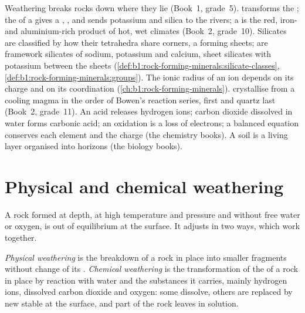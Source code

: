 \begin{recall}
Weathering breaks rocks down where they lie (Book~1, grade~5).  transforms the ; the  of a  gives a , , and sends potassium and silica to the rivers; a  is
the red, iron- and aluminium-rich product of hot, wet climates (Book~2,
grade~10). Silicates are classified by how their  tetrahedra share
corners, a  forming sheets;  are framework silicates of
sodium, potassium and calcium,  sheet silicates with potassium between the
sheets (\cref{def:b1:rock-forming-minerals:silicate-classes},
\cref{def:b1:rock-forming-minerals:groups}). The ionic radius of an ion depends on
its charge and on its coordination (\cref{ch:b1:rock-forming-minerals}). 
crystallise from a cooling magma in the order of Bowen's reaction series,
 first and quartz last (Book~2, grade~11). An acid releases hydrogen
ions; carbon dioxide dissolved in water forms carbonic acid; an oxidation is a
loss of electrons; a balanced equation conserves each element and the charge
(the chemistry books). A soil is a living layer organised into horizons (the
biology books).
\end{recall}

\section{Physical and chemical weathering}\label{sec:b1:weathering-clays:types}

A rock formed at depth, at high temperature and pressure and without free water
or oxygen, is out of equilibrium at the surface. It adjusts in two ways, which
work together.

\begin{definition}\label{def:b1:weathering-clays:weathering}
\emph{Physical weathering} is the breakdown of a
rock in place into smaller fragments without change of its .
\emph{Chemical weathering} is the transformation of
the  of a rock in place by reaction with water and the substances it
carries, mainly hydrogen ions, dissolved carbon dioxide and oxygen: some
 dissolve, others are replaced by new  stable at the surface,
and part of the rock leaves in solution.
\end{definition}

